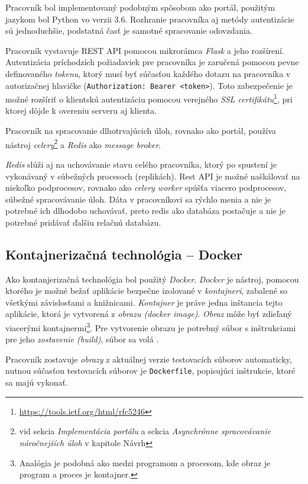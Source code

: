\documentclass[
  digital, %
  twoside, %
  table,   %
  lof,     %
  lot,     %
]{fithesis3}
\begin{document}
Pracovník bol implementovaný podobným spôsobom ako portál, použitým jazykom bol Python vo verzii 3.6. Rozhranie pracovníka aj metódy autentizácie sú jednoduchšie, podstatná časť je samotné spracovanie odovzdania.

Pracovník vystavuje REST API pomocou mikrorámca \emph{Flask} a jeho rozšírení. 
Autentizácia príchodzích požiadaviek pre pracovníka je zaručená pomocou pevne definovaného \emph{tokenu}, ktorý musí byť súčasťou každého dotazu na pracovníka v autorizačnej hlavičke (\texttt{Authorization: Bearer <token>}). Toto zabezpečenie je možné rozšíriť o klientskú autentizáciu pomocou verejného \emph{SSL certifikátu}\footnote{\url{https://tools.ietf.org/html/rfc5246}}, pri ktorej dôjde k overeniu serveru aj klienta. 

Pracovník na spracovanie dlhotrvajúcich úloh, rovnako ako portál, používa nástroj \emph{celery}\footnote{vid sekcia \emph{Implementácia portálu} a sekcia \emph{Asynchrónne spracovávanie náročnejších úloh} v kapitole Návrh} a \emph{Redis} ako \emph{message broker}. 

\emph{Redis} slúži aj na uchovávanie stavu celého pracovníka, ktorý po spustení je vykonávaný v súbežných procesoch (replikách). Rest API je možné naškálovať na niekoľko podprocesov, rovnako ako \emph{celery worker} spúšťa viacero podprocesov, súbežné spracovávanie úloh. Dáta v pracovníkovi sa rýchlo menia a nie je potrebné ich dlhodobo uchovávať, preto redis ako databáza postačuje a nie je potrebné pridávať ďalšiu relačnú databázu.

\subsection{Kontajnerizačná technológia -- Docker}

Ako kontanjerizačná technológia bol použitý \emph{Docker}. \emph{Docker} je nástroj, pomocou ktorého je možné bežať aplikácie bezpečne izolované v \emph{kontajneri}, zabalené so všetkými závislosťami a knižnicami. \emph{Kontajner} je práve jedna inštancia tejto aplikácie, ktorá je vytvorená z \emph{obrazu (docker image)}. \emph{Obraz} môže byť zdieľaný viacerými kontajnermi\footnote{Analógia je podobná ako medzi programom a procesom, kde obraz je program a proces je kontajner.}. Pre vytvorenie obrazu je potrebný súbor s inštrukciami pre jeho \emph{zostavenie (build)}, súbor sa volá .

Pracovník zostavuje \emph{obrazy} z aktuálnej verzie testovacích súborov automaticky, nutnou súčasťou testovacích súborov je \texttt{Dockerfile}, popisujúci inštrukcie, ktoré sa majú vykonať.
\end{document}
